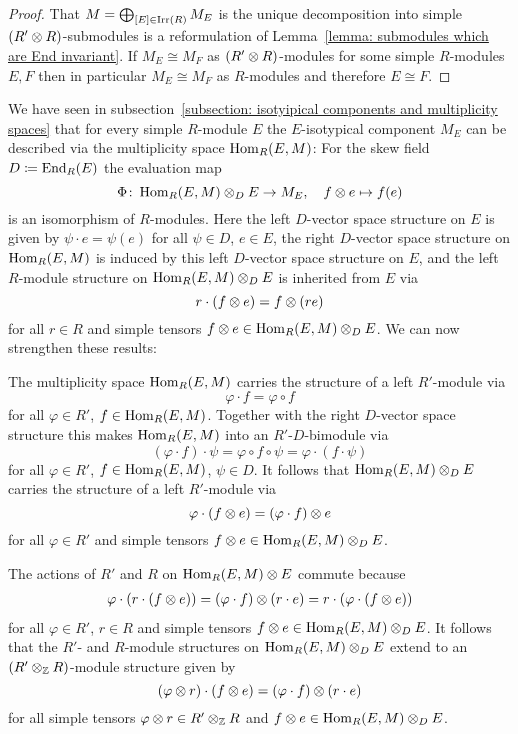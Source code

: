 \begin{proof}
  That $M = \bigoplus_{[E] \in \operatorname{Irr}(R)} M_E$ is the unique decomposition into simple $(R' \mathbin{\otimes} R)$-submodules is a reformulation of Lemma~\ref{lemma: submodules which are End invariant}.
  If $M_E \cong M_F$ as $(R' \mathbin{\otimes} R)$-modules for some simple $R$-modules $E, F$ then in particular $M_E \cong M_F$ as $R$-modules and therefore $E \cong F$.
\end{proof}




\begin{fluff}
  We have seen in subsection~\ref{subsection: isotyipical components and multiplicity spaces} that for every simple $R$-module $E$ the $E$-isotypical component $M_E$ can be described via the multiplicity space $\operatorname{Hom}_R(E,M)$:
  For the skew field $D \coloneqq \operatorname{End}_R(E)$ the evaluation map
  \[
            \Phi
    \colon  \operatorname{Hom}_R(E, M) \mathbin{\otimes}_D E
    \to     M_E,
    \quad   f \mathbin{\otimes} e
    \mapsto f(e)
  \]
  is an isomorphism of $R$-modules.
  Here the left $D$-vector space structure on $E$ is given by $\psi \cdot e = \psi(e)$ for all $\psi \in D$, $e \in E$, the right $D$-vector space structure on $\operatorname{Hom}_R(E,M)$ is induced by this left $D$-vector space structure on $E$, and the left $R$-module structure on $\operatorname{Hom}_R(E,M) \mathbin{\otimes}_D E$ is inherited from $E$ via
  \[
      r \cdot (f \mathbin{\otimes} e)
    = f \mathbin{\otimes} (re)
  \]
  for all $r \in R$ and simple tensors $f \mathbin{\otimes} e \in \operatorname{Hom}_R(E,M) \mathbin{\otimes}_D E$.
  We can now strengthen these results:
  
  The multiplicity space $\operatorname{Hom}_R(E,M)$ carries the structure of a left $R'$-module via
  \[
      \varphi \cdot f
    = \varphi \circ f
  \]
  for all $\varphi \in R'$, $f \in \operatorname{Hom}_R(E,M)$.
  Together with the right $D$-vector space structure this makes $\operatorname{Hom}_R(E,M)$ into an $R'$-$D$-bimodule via
  \[
      (\varphi \cdot f) \cdot \psi
    = \varphi \circ f \circ \psi
    = \varphi \cdot (f \cdot \psi)
  \]
  for all $\varphi \in R'$, $f \in \operatorname{Hom}_R(E,M)$, $\psi \in D$.
  It follows that $\operatorname{Hom}_R(E,M) \mathbin{\otimes}_D E$ carries the structure of a left $R'$-module via
  \[
      \varphi \cdot (f \mathbin{\otimes} e)
    = (\varphi \cdot f) \mathbin{\otimes} e
  \]
  for all $\varphi \in R'$ and simple tensors $f \mathbin{\otimes} e \in \operatorname{Hom}_R(E,M) \mathbin{\otimes}_D E$.
  
  The actions of $R'$ and $R$ on $\operatorname{Hom}_R(E, M) \mathbin{\otimes} E$ commute because
  \begin{align*}
        \varphi \cdot (r \cdot (f \mathbin{\otimes} e))
     =  (\varphi \cdot f) \mathbin{\otimes} (r \cdot e)
     =  r \cdot (\varphi \cdot (f \mathbin{\otimes} e))
  \end{align*}
  for all $\varphi \in R'$, $r \in R$ and simple tensors $f \mathbin{\otimes} e \in \operatorname{Hom}_R(E,M) \mathbin{\otimes}_D E$.
  It follows that the $R'$- and $R$-module structures on $\operatorname{Hom}_R(E,M) \mathbin{\otimes}_D E$ extend to an $(R' \mathbin{\otimes}_{\mathbb{Z}} R)$-module structure given by
  \[
      (\varphi \mathbin{\otimes} r) \cdot (f \mathbin{\otimes} e)
    = (\varphi \cdot f) \mathbin{\otimes} (r \cdot e)
  \]
  for all simple tensors $\varphi \mathbin{\otimes} r \in R' \mathbin{\otimes}_{\mathbb{Z}} R$ and $f \mathbin{\otimes} e \in \operatorname{Hom}_R(E,M) \mathbin{\otimes}_D E$.
\end{fluff}


